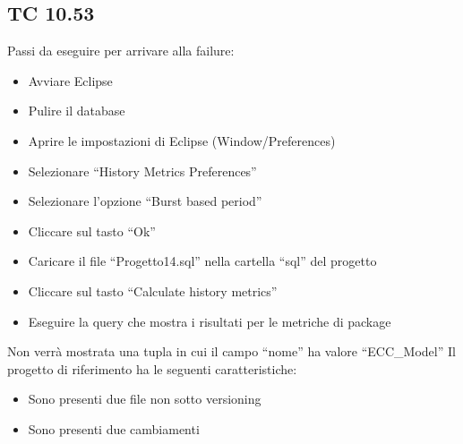 \subsection*{TC 10.53}
Passi da eseguire per arrivare alla failure:
\begin{itemize}
 \item Avviare Eclipse
 \item Pulire il database
 \item Aprire le impostazioni di Eclipse (Window/Preferences)
 \item Selezionare ``History Metrics Preferences''
 \item Selezionare l'opzione ``Burst based period''
 \item Cliccare sul tasto ``Ok''
 \item Caricare il file ``Progetto14.sql'' nella cartella ``sql'' del progetto
 \item Cliccare sul tasto ``Calculate history metrics''
 \item Eseguire la query che mostra i risultati per le metriche di package
\end{itemize}
Non verrà mostrata una tupla in cui il campo ``nome'' ha valore ``ECC\_Model''
\vspace{0.5cm}
\newline
Il progetto di riferimento ha le seguenti caratteristiche:
\begin{itemize}
 \item Sono presenti due file non sotto versioning
 \item Sono presenti due cambiamenti
\end{itemize}





\newpage





